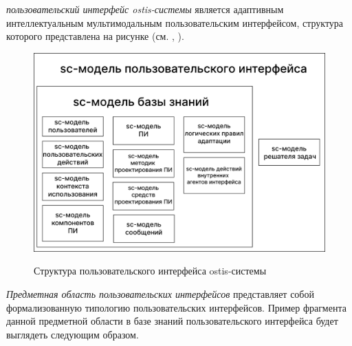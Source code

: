 \textit{пользовательский интерфейс ostis-системы} является адаптивным интеллектуальным мультимодальным пользовательским интерфейсом, структура которого представлена на рисунке  (см. , ).

\begin{figure}[H]
	\centering
	\caption{Структура пользовательского интерфейса ostis-системы}
	\includegraphics[scale=0.3]{author/part4/figures/ui_model.png}
	\label{fig:ostis_ui_structure}
\end{figure}

\textit{Предметная область пользовательских интерфейсов} представляет собой формализованную типологию пользовательских интерфейсов. Пример фрагмента данной предметной области в базе знаний пользовательского интерфейса будет выглядеть следующим образом.

\begin{SCn}
\end{SCn}


